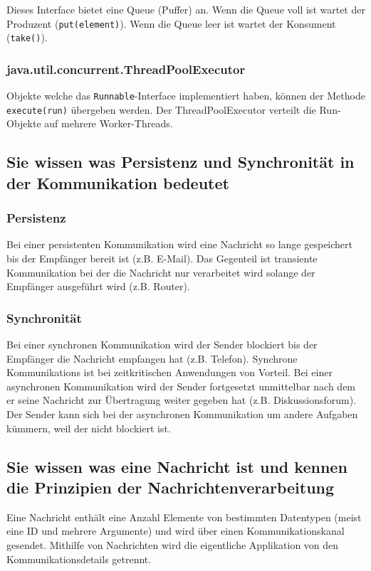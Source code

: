 Dieses Interface bietet eine Queue (Puffer) an. Wenn die Queue voll ist wartet der Produzent (\verb|put(element)|). Wenn die Queue leer ist wartet der Konsument (\verb|take()|).

\subsubsection{java.util.concurrent.ThreadPoolExecutor}

Objekte welche das \verb|Runnable|-Interface implementiert haben, können der Methode \verb|execute(run)| übergeben werden. Der ThreadPoolExecutor verteilt die Run-Objekte auf mehrere Worker-Threads. 

\subsection{Sie wissen was Persistenz und Synchronität in der Kommunikation bedeutet}

\subsubsection{Persistenz}

Bei einer persistenten Kommunikation wird eine Nachricht so lange gespeichert bis der Empfänger bereit ist (z.B. E-Mail). Das Gegenteil ist transiente Kommunikation bei der die Nachricht nur verarbeitet wird solange der Empfänger ausgeführt wird (z.B. Router). 

\subsubsection{Synchronität}

Bei einer synchronen Kommunikation wird der Sender blockiert bis der Empfänger die Nachricht empfangen hat (z.B. Telefon). Synchrone Kommunikations ist bei zeitkritischen Anwendungen von Vorteil. Bei einer asynchronen Kommunikation wird der Sender fortgesetzt unmittelbar nach dem er seine Nachricht zur Übertragung weiter gegeben hat (z.B. Diskussionsforum). Der Sender kann sich bei der asynchronen Kommunikation um andere Aufgaben kümmern, weil der nicht blockiert ist.

\subsection{Sie wissen was eine Nachricht ist und kennen die Prinzipien der Nachrichtenverarbeitung}

Eine Nachricht enthält eine Anzahl Elemente von bestimmten Datentypen (meist eine ID und mehrere Argumente) und wird über einen Kommunikationskanal gesendet. Mithilfe von Nachrichten wird die eigentliche Applikation von den Kommunikationsdetails getrennt.

